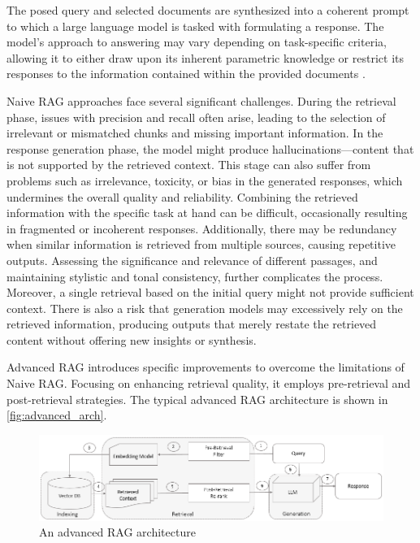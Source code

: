 The posed query and selected documents are synthesized into a coherent prompt to which a large language model is tasked with formulating a response. The model’s approach to answering may vary depending on task-specific criteria, allowing it to either draw upon its inherent parametric knowledge or restrict its responses to the information contained within the provided documents \cite{Gao.18Dec2023}.

Naive RAG approaches face several significant challenges. During the retrieval phase, issues with precision and recall often arise, leading to the selection of irrelevant or mismatched chunks and missing important information. In the response generation phase, the model might produce hallucinations—content that is not supported by the retrieved context. This stage can also suffer from problems such as irrelevance, toxicity, or bias in the generated responses, which undermines the overall quality and reliability. Combining the retrieved information with the specific task at hand can be difficult, occasionally resulting in fragmented or incoherent responses. Additionally, there may be redundancy when similar information is retrieved from multiple sources, causing repetitive outputs. Assessing the significance and relevance of different passages, and maintaining stylistic and tonal consistency, further complicates the process. Moreover, a single retrieval based on the initial query might not provide sufficient context. There is also a risk that generation models may excessively rely on the retrieved information, producing outputs that merely restate the retrieved content without offering new insights or synthesis\cite{Gao.18Dec2023}.

Advanced RAG introduces specific improvements to overcome the limitations of Naive RAG. Focusing on enhancing retrieval quality, it employs pre-retrieval and post-retrieval strategies. The typical advanced RAG architecture is shown in \autoref{fig:advanced_arch}.\\ 
\begin{figure}[h!]
\centering
\includegraphics[width=1\textwidth]{Figures/advanced_arch.png}
\caption{An advanced RAG architecture}
\label{fig:advanced_arch}
\end{figure}

